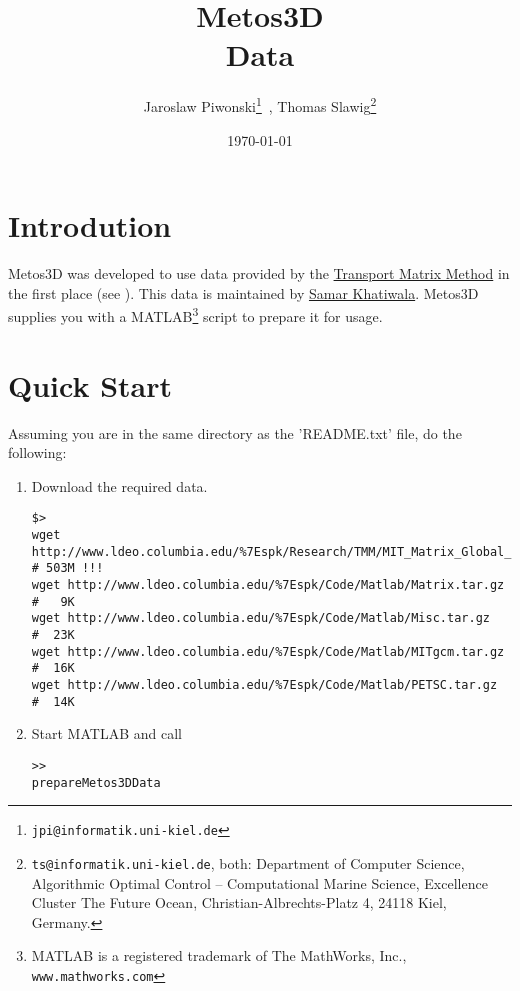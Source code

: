 \documentclass{article}
\begin{document}
%
%
\title{
Metos3D \\
\bigskip
Data
}
\author{
Jaroslaw Piwonski\thanks{\texttt{jpi@informatik.uni-kiel.de}} \,,
Thomas Slawig\thanks{\texttt{ts@informatik.uni-kiel.de},
both: Department of Computer Science, Algorithmic Optimal Control -- Computational Marine Science,
Excellence Cluster The Future Ocean, Christian-Albrechts-Platz 4, 24118 Kiel, Germany.}
}
\date{\today}
\maketitle

%
%
\section{Introdution}

Metos3D was developed to use data provided by the
\href{http://www.ldeo.columbia.edu/~spk/Research/TMM/tmm.html}{Transport Matrix Method}
in the first place (see \cite{KhViCa05}).
%
This data is maintained by
\href{http://www.ldeo.columbia.edu/~spk/}{Samar Khatiwala}.
%
Metos3D supplies you with a
MATLAB\footnote{MATLAB is a registered trademark of The MathWorks, Inc., 
\texttt{www.mathworks.com}}
script to prepare it for usage.

%
%
\section{Quick Start}

Assuming you are in the same directory as the 'README.txt' file, do the following:

\begin{enumerate}
\item Download the required data.
\begin{verbatim}
$>
wget http://www.ldeo.columbia.edu/%7Espk/Research/TMM/MIT_Matrix_Global_2.8deg.tar.gz  # 503M !!! 
wget http://www.ldeo.columbia.edu/%7Espk/Code/Matlab/Matrix.tar.gz                     #   9K
wget http://www.ldeo.columbia.edu/%7Espk/Code/Matlab/Misc.tar.gz                       #  23K
wget http://www.ldeo.columbia.edu/%7Espk/Code/Matlab/MITgcm.tar.gz                     #  16K
wget http://www.ldeo.columbia.edu/%7Espk/Code/Matlab/PETSC.tar.gz                      #  14K
\end{verbatim}
\item Start MATLAB and call
\begin{verbatim}
>>
prepareMetos3DData
\end{verbatim}
\end{enumerate}
\end{document}
